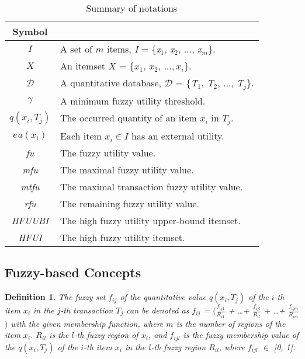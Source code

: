 \documentclass[journal]{IEEEtran}
\newtheorem{definition}{Definition}[section]
\begin{document}
\begin{table}[!htbp]
	\centering
	\small
	\caption{Summary of notations}
	\label{tab:table_Notation}
	\begin{tabular}{|c|l|}
		\hline
		\textbf{Symbol} & \makebox[6cm][c]{\textbf{Description}}  \\ \hline
		$I$ &  A set of $m$ items, \textit{I} = \{\textit{x}$_{1}$, \textit{x}$_{2}$, $\ldots$, \textit{x}$_{m}$\}. \\ \hline		
		$X$ & An itemset $X$ = $\{x_1$, $x_2$, $ \ldots, x_i\}$. \\ \hline		
		$\mathcal{D}$	&  A quantitative database, $\mathcal{D}$ = \{\textit{T}$_{1}$, \textit{T}$_{2}$, $\ldots$, \textit{T$_{j}$}\}.  \\ \hline
		
		$\gamma$ &   A  minimum fuzzy utility threshold. \\ \hline	
		
		$q(x_i, T_j)$ &   The occurred quantity of an item $x_i$ in $T_j$. \\ \hline
		$eu(x_i)$ &   Each item $x_i \in I$ has an external utility. \\ \hline
		
		\textit{fu} &  The fuzzy utility value. \\ \hline
		\textit{mfu} &  The maximal fuzzy utility value. \\ \hline
		\textit{mtfu} &  The maximal transaction fuzzy utility value. \\ \hline
		\textit{rfu} &  The remaining fuzzy utility value. \\ \hline
		\textit{HFUUBI}  &  The high fuzzy utility upper-bound itemset. \\ \hline	
		\textit{HFUI} &   The high fuzzy utility itemset. \\ \hline
	\end{tabular}
\end{table}

\subsection{Fuzzy-based Concepts}

\begin{definition}
	\rm The fuzzy set $f_{ij}$ of the quantitative value $q(x_i, T_j)$ of the $i$-th item $x_i$ in the $j$-th transaction $T_j$ can be denoted as $f_{ij}$ = $\big($$\frac{f_{ij1}}{R_{i1}}$ + \ldots + $\frac{f_{ijl}}{R_{il}}$ + \ldots + $\frac{f_{ijm}}{R_{im}}$$\big)$ with the given membership function, where $m$ is the number of regions of the item $x_i$. $R_{il}$ is the $l$-th fuzzy region of $x_i$, and $f_{ijl}$ is the fuzzy membership value of the $q(x_i, T_j)$ of the $i$-th item $x_i$ in the $l$-th fuzzy region $R_{il}$, where $f_{ijl}$ $\in$ [0, 1].
\end{definition}
\end{document}
